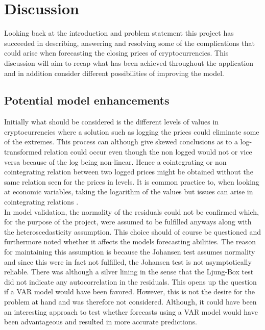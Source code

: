 \chapter{Discussion}
Looking back at the introduction and problem statement this project has succeeded in describing, answering and resolving some of the complications that could arise when forecasting the closing prices of cryptocurrencies. This discussion will aim to recap what has been achieved throughout the application and in addition consider different possibilities of improving the model.\\
\section{Potential model enhancements}
Initially what should be considered is the different levels of values in cryptocurrencies where a solution such as logging the prices could eliminate some of the extremes. This process can although give skewed conclusions as to a log-transformed relation could occur even though the non logged would not or vice versa because of the log being non-linear. Hence a cointegrating or non cointegrating relation between two logged prices might be obtained without the same relation seen for the prices in levels. It is common practice to, when looking at economic variables, taking the logarithm of the values but issues can arise in cointegrating relations \cite{cointegrationloggedissues}.\\

\noindent In model validation, the normality of the residuals could not be confirmed which, for the purpose of the project, were assumed to be fulfilled anyways along with the heteroscedasticity assumption. This choice should of course be questioned and furthermore noted whether it affects the models forecasting abilities. The reason for maintaining this assumption is because the Johansen test assumes normality and since this were in fact not fulfilled, the Johansen test is not asymptotically reliable. There was although a silver lining in the sense that the Ljung-Box test did not indicate any autocorrelation in the residuals. This opens up the question if a VAR model would have been favored. However, this is not the desire for the problem at hand and was therefore not considered. Although, it could have been an interesting approach to test whether forecasts using a VAR model would have been advantageous and resulted in more accurate predictions.\\

